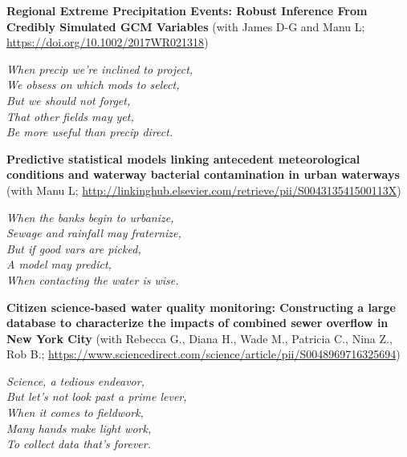 \documentclass{article}
\begin{document}
\newpage

\noindent
\textbf{Regional Extreme Precipitation Events: Robust Inference From Credibly Simulated GCM Variables} (with James D-G and Manu L; \url{https://doi.org/10.1002/2017WR021318})\\

\vspace{0.25cm}

{\large
\noindent
\textit{When precip we're inclined to project,\\
We obsess on which mods to select,\\
\null \hspace{0.5cm} But we should not forget,\\
\null \hspace{0.5cm} That other fields may yet,\\
Be more useful than precip direct.}
}

\vspace{1.0cm}


\noindent
\textbf{Predictive statistical models linking antecedent meteorological conditions and waterway bacterial contamination in urban waterways} (with Manu L; \url{http://linkinghub.elsevier.com/retrieve/pii/S004313541500113X})\\

\vspace{0.25cm}

{\large
\noindent
\textit{When the banks begin to urbanize,\\
Sewage and rainfall may fraternize,\\
\null \hspace{0.5cm} But if good vars are picked,\\
\null \hspace{0.5cm} A model may predict,\\
When contacting the water is wise.}
}

\vspace{1.0cm}

\noindent
\textbf{Citizen science-based water quality monitoring: Constructing a large database to characterize the impacts of combined sewer overflow in New York City} (with Rebecca G., Diana H., Wade M., Patricia C., Nina Z., Rob B.; \url{https://www.sciencedirect.com/science/article/pii/S0048969716325694})\\

\vspace{0.25cm}

{\large
\noindent
\textit{Science, a tedious endeavor,\\
But let’s not look past a prime lever,\\
\null \hspace{0.5cm} When it comes to fieldwork,\\
\null \hspace{0.5cm} Many hands make light work,\\
To collect data that’s forever.}
}
\end{document}
